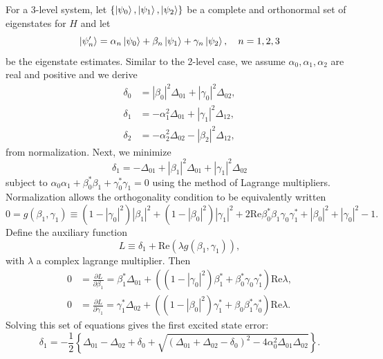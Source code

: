 \documentclass[aps,10pt,superscriptaddress,floatfix,nofootinbib,notitlepage]{revtex4-1}
\begin{document}
For a 3-level system, let $\{\ket{\psi_0},\ket{\psi_1},\ket{\psi_2}\}$ be a complete and orthonormal set of eigenstates for $H$ and let
\begin{equation}
    \ket{\psi_n'}
    =\alpha_n\ket{\psi_0}
    +\beta_n\ket{\psi_1}
    +\gamma_n\ket{\psi_2},
    \quad
    n=1,2,3
\end{equation}
be the eigenstate estimates. Similar to the 2-level case, we assume $\alpha_0,\alpha_1,\alpha_2$ are real and positive and we derive 
\begin{align}
    \label{eq_delta0}
    \delta_0
    &=|\beta_0|^2\Delta_{01}
    +|\gamma_0|^2\Delta_{02}, \\ 
    \label{eq_delta1}
    \delta_1
    &=-\alpha_1^2\Delta_{01}
    +|\gamma_1|^2\Delta_{12}, \\
    \delta_2
    &=-\alpha_2^2\Delta_{02}
    -|\beta_2|^2\Delta_{12},
\end{align}
from normalization. Next, we minimize
\begin{equation}
    \delta_1
    =-\Delta_{01}
    +|\beta_1|^2\Delta_{01}
    +|\gamma_1|^2\Delta_{02}
\end{equation}
subject to $\alpha_0\alpha_1+\beta_0^*\beta_1+\gamma_0^*\gamma_1=0$ using the method of Lagrange multipliers. Normalization allows the orthogonality condition to be equivalently written
\begin{equation}
    0
    =g(\beta_1,\gamma_1)
    \equiv
    (1-|\gamma_0|^2)|\beta_1|^2
    +(1-|\beta_0|^2)|\gamma_1|^2
    +2\text{Re}\beta_0^*\beta_1\gamma_0\gamma_1^*
    +|\beta_0|^2+|\gamma_0|^2-1.
\end{equation}
Define the auxiliary function
\begin{equation}
    L
    \equiv
    \delta_1
    +\text{Re}(\lambda g(\beta_1,\gamma_1)),
\end{equation}
with $\lambda$ a complex lagrange multiplier. Then
\begin{align}
    0
    &=\frac{\partial L}{\partial\beta_1}
    =\beta_1^*\Delta_{01}
    +((1-|\gamma_0|^2)\beta_1^*+\beta_0^*\gamma_0\gamma_1^*)\text{Re}\lambda, \\
    0
    &=\frac{\partial L}{\partial\gamma_1}
    =\gamma_1^*\Delta_{02}
    +((1-|\beta_0|^2)\gamma_1^*+\beta_0\beta_1^*\gamma_0^*)\text{Re}\lambda.
\end{align}
Solving this set of equations gives the first excited state error:
\begin{equation}\label{eq_error1}
    \delta_1
    =-\frac{1}{2}
    \left\{
    \Delta_{01}
    -\Delta_{02}
    +\delta_0
    +\sqrt{(\Delta_{01}+\Delta_{02}-\delta_0)^2
    -4\alpha_0^2\Delta_{01}\Delta_{02}}
    \right\}.
\end{equation}
\end{document}
